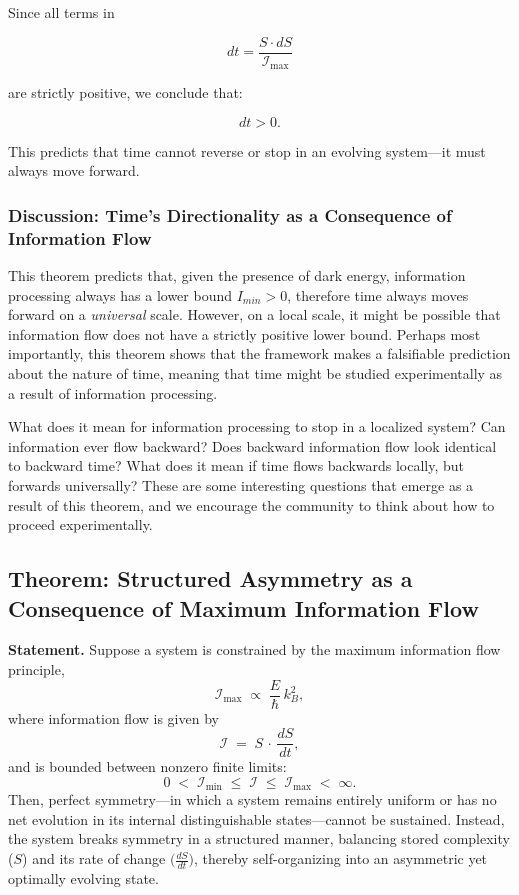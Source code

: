 \documentclass[12pt]{article}
\begin{document}
Since all terms in 

\begin{equation}
    dt = \frac{S \cdot dS}{\mathcal{I}_{\max}}
\end{equation}

are strictly positive, we conclude that:

\begin{equation}
    dt > 0.
\end{equation}

This predicts that time cannot reverse or stop in an evolving system—it must always move forward.


\subsubsection{Discussion: Time's Directionality as a Consequence of Information Flow}

This theorem predicts that, given the presence of dark energy, information processing always has a lower bound $I_{min} > 0$, therefore time always moves forward on a \textit{universal} scale. However, on a local scale, it might be possible that information flow does not have a strictly positive lower bound. Perhaps most importantly, this theorem shows that the framework makes a falsifiable prediction about the nature of time, meaning that time might be studied experimentally as a result of information processing.

What does it mean for information processing to stop in a localized system? Can information ever flow backward? Does backward information flow look identical to backward time? What does it mean if time flows backwards locally, but forwards universally? These are some interesting questions that emerge as a result of this theorem, and we encourage the community to think about how to proceed experimentally.


\subsection{Theorem: Structured Asymmetry as a Consequence of Maximum Information Flow}

\textbf{Statement.} Suppose a system is constrained by the maximum information flow principle,
\[
   \mathcal{I}_{\max} \;\propto\; \frac{E}{\hbar}\,k_B^2,
\]
where information flow is given by
\[
   \mathcal{I} \;=\; S \,\cdot\, \frac{dS}{dt},
\]
and is bounded between nonzero finite limits:
\[
   0 \;<\;\mathcal{I}_{\min} \;\le\; \mathcal{I} \;\le\; \mathcal{I}_{\max} \;<\;\infty.
\]
Then, perfect symmetry---in which a system remains entirely uniform or has no net evolution in its internal distinguishable states---cannot be sustained. Instead, the system breaks symmetry in a structured manner, balancing stored complexity (\(S\)) and its rate of change \(\bigl(\tfrac{dS}{dt}\bigr)\), thereby self-organizing into an asymmetric yet optimally evolving state.
\end{document}
